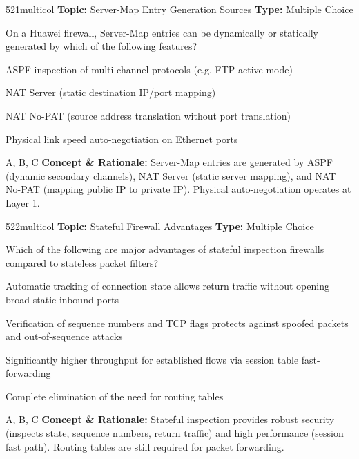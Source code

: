 \begin{qcard}{521}{multicol}
\textcolor{darkslate!75}{\small\textbf{Topic:} Server-Map Entry Generation Sources \hfill \textbf{Type:} Multiple Choice}\vspace{0.4em}\par
On a Huawei firewall, Server-Map entries can be dynamically or statically generated by which of the following features?
\begin{qoptions}
\item ASPF inspection of multi-channel protocols (e.g. FTP active mode)
\item NAT Server (static destination IP/port mapping)
\item NAT No-PAT (source address translation without port translation)
\item Physical link speed auto-negotiation on Ethernet ports
\end{qoptions}
\end{qcard}
\nopagebreak
\begin{explainbox}{A, B, C}
\textbf{Concept \& Rationale:} Server-Map entries are generated by ASPF (dynamic secondary channels), NAT Server (static server mapping), and NAT No-PAT (mapping public IP to private IP). Physical auto-negotiation operates at Layer 1.
\end{explainbox}

\begin{qcard}{522}{multicol}
\textcolor{darkslate!75}{\small\textbf{Topic:} Stateful Firewall Advantages \hfill \textbf{Type:} Multiple Choice}\vspace{0.4em}\par
Which of the following are major advantages of stateful inspection firewalls compared to stateless packet filters?
\begin{qoptions}
\item Automatic tracking of connection state allows return traffic without opening broad static inbound ports
\item Verification of sequence numbers and TCP flags protects against spoofed packets and out-of-sequence attacks
\item Significantly higher throughput for established flows via session table fast-forwarding
\item Complete elimination of the need for routing tables
\end{qoptions}
\end{qcard}
\nopagebreak
\begin{explainbox}{A, B, C}
\textbf{Concept \& Rationale:} Stateful inspection provides robust security (inspects state, sequence numbers, return traffic) and high performance (session fast path). Routing tables are still required for packet forwarding.
\end{explainbox}

